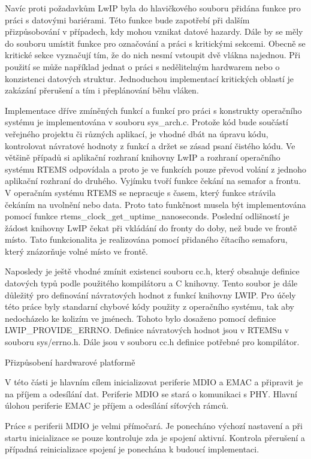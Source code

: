 Navíc proti požadavkům LwIP byla do hlavičkového souboru přidána funkce pro práci s datovými bariérami.
Této funkce bude zapotřebí při dalším přizpůsobování v případech, kdy mohou vznikat datové hazardy.
Dále by se měly do souboru umístit funkce pro označování a práci s kritickými sekcemi.
Obecně se kritické sekce vyznačují tím, že do nich nesmí vstoupit dvě vlákna najednou.
Při použití se může například jednat o práci s nedělitelným hardwarem nebo o konzistenci datových struktur.
Jednoduchou implementací kritických oblastí je zakázání přerušení a tím i přeplánování běhu vláken.

Implementace dříve zmíněných funkcí a funkcí pro práci s konstrukty operačního systému je implementována v souboru sys\_arch.c.
Protože kód bude součástí veřejného projektu či různých aplikací, je vhodné dbát na úpravu kódu, kontrolovat návratové hodnoty z funkcí a držet se zásad psaní čistého kódu.
Ve většině případů si aplikační rozhraní knihovny LwIP a rozhraní operačního systému RTEMS odpovídala a proto je ve funkcích pouze převod volání z jednoho aplikační rozhraní do druhého.
Vyjímku tvoří funkce čekání na semafor a frontu.
V operačním systému RTEMS se nepracuje s časem, který funkce strávila čekáním na uvolnění nebo data.
Proto tato funkčnost musela být implementována pomocí funkce rtems\_clock\_get\_uptime\_nanoseconds.
Poslední odlišností je žádost knihovny LwIP čekat při vkládání do fronty do doby, než bude ve frontě místo.
Tato funkcionalita je realizována pomocí přidaného čítacího semaforu, který znázorňuje volné místo ve frontě.

Naposledy je ještě vhodné zmínit existenci souboru cc.h, který obsahuje definice datových typů podle použitého kompilátoru a C knihovny.
Tento soubor je dále důležitý pro definování návratových hodnot z funkcí knihovny LWIP.
Pro účely této práce byly standarní chybové kódy použity z operačního systému, tak aby nedocházelo ke kolizím ve jménech.
Tohoto bylo dosaženo pomocí definice LWIP\_PROVIDE\_ERRNO.
Definice návratových hodnot jsou v RTEMSu v souboru sys/errno.h.
Dále jsou v souboru cc.h definice potřebné pro kompilátor.

\secc Přizpůsobení hardwarové platformě

V této části je hlavním cílem inicializovat periferie MDIO a EMAC a připravit je na příjem a odesílání dat.
Periferie MDIO se stará o komunikaci s PHY.
Hlavní úlohou periferie EMAC je příjem a odesílání síťových rámců. 

Práce s periferii MDIO je velmi přímočará.
Je ponecháno výchozí nastavení a při startu inicializace se pouze kontroluje zda je spojení aktivní.
Kontrola přerušení a případná reinicializace spojení je ponechána k budoucí implementaci.

